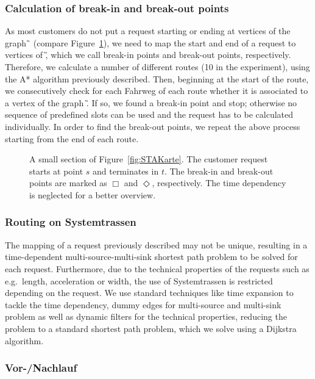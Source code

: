 \subsubsection{Calculation of break-in and break-out points}
%
As most customers do not put a request starting or ending at vertices of the graph \G\, (compare Figure~\ref{fig:E-A-Pkte}), we need to map the start and end of a request to vertices of \G, which we call break-in points and break-out points, respectively. Therefore, we calculate a number of different routes (10 in the experiment), using the A* algorithm previously described. Then, beginning at the start of the route, we consecutively check for each Fahrweg of each route whether it is associated to a vertex of the graph \G. If so, we found a break-in point and stop; otherwise no sequence of predefined slots can be used and the request has to be calculated individually. In order to find the break-out points, we repeat the above process starting from the end of each route.
%
\begin{figure}[tb]
	\centering
	\caption{A small section of Figure~\ref{fig:STAKarte}. The customer request starts at point $s$ and terminates in $t$. The break-in and break-out points are marked as $\Box$ and $\Diamond$, respectively. The time dependency is neglected for a better overview.}
	\label{fig:E-A-Pkte}
\end{figure}

\subsubsection{Routing on Systemtrassen}
The mapping of a request previously described may not be unique, resulting in a time-dependent multi-source-multi-sink shortest path problem to be solved for each request. Furthermore, due to the technical properties of the requests such as e.g.\ length, acceleration or width, the use of Systemtrassen is restricted depending on the request.
We use standard techniques like time expansion to tackle the time dependency, dummy edges for multi-source and multi-sink problem as well as dynamic filters for the technical properties, reducing the problem to a standard shortest path problem, which we solve using a Dijkstra algorithm.

\subsubsection{Vor-/Nachlauf}

